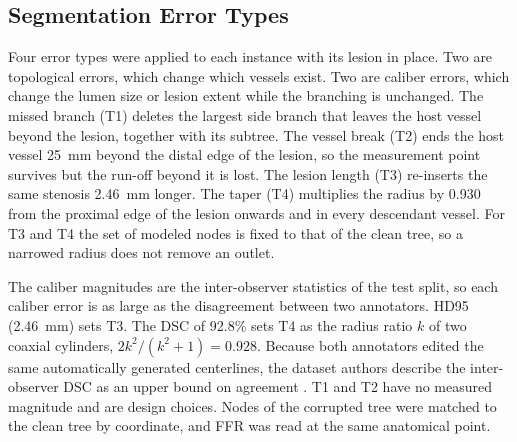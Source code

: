 \documentclass[journal]{IEEEtran}
\begin{document}
\subsection{Segmentation Error Types}
Four error types were applied to each instance with its lesion in place. Two are
topological errors, which change which vessels exist. Two are caliber errors, which change the lumen size or lesion
extent while the branching is unchanged. The missed branch (T1) deletes the largest side branch that leaves the host
vessel beyond the lesion, together with its subtree. The vessel break (T2) ends the host vessel 25~mm beyond the
distal edge of the lesion, so the measurement point survives but the run-off beyond it is lost. The lesion length
(T3) re-inserts the same stenosis 2.46~mm longer. The taper (T4) multiplies the radius by 0.930 from the proximal
edge of the lesion onwards and in every descendant vessel. For T3 and T4 the set of modeled nodes is fixed to that
of the clean tree, so a narrowed radius does not remove an outlet.

The caliber magnitudes are the inter-observer statistics of the test split, so each caliber error is as large as
the disagreement between two annotators. HD95 (2.46~mm) sets T3. The DSC of 92.8\% sets T4 as the radius
ratio $k$ of two coaxial cylinders, $2k^2/(k^2+1) = 0.928$. Because both annotators edited the same automatically
generated centerlines, the dataset authors describe the inter-observer DSC as an upper bound on agreement \cite{bransby2026}. T1 and T2 have
no measured magnitude and are design choices. Nodes of the corrupted tree were matched to the clean tree by
coordinate, and FFR was read at the same anatomical point.
\end{document}
